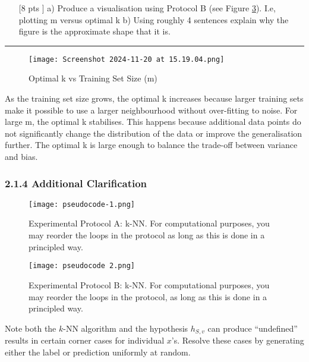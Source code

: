 \documentclass{article}
\begin{document}
\begin{enumerate}
    \item[[8 pts]] a) Produce a visualisation using Protocol B (see Figure \ref{pseudocode 2}). I.e, plotting m versus optimal k b) Using roughly 4 sentences explain why the figure is the approximate shape that it is.
\end{enumerate}


\noindent\textcolor{gray}{\rule{0.1\linewidth}{0.5pt}}

\begin{figure}[H]
    \centering
    \texttt{[image: Screenshot 2024-11-20 at 15.19.04.png]}
    \caption{Optimal k vs Training Set Size (m)}
    \label{fig:enter-label}
\end{figure}

As the training set size grows, the optimal k increases because larger training sets make it possible to use a larger neighbourhood without over-fitting to noise. For large m, the optimal k stabilises. This happens because additional data points do not significantly change the distribution of the data or improve the generalisation further. The optimal k is large enough to balance the trade-off between variance and bias.



\subsubsection*{2.1.4 Additional Clarification}

\begin{figure}[H]
    \centering
    \texttt{[image: pseudocode-1.png]}
    \caption{Experimental Protocol A: k-NN. For computational purposes, you may reorder the loops in the protocol as long as this is done in a principled way.}
    \label{pseudocode 1}
\end{figure}

\begin{figure}[H]
    \centering
    \texttt{[image: pseudocode 2.png]}
    \caption{Experimental Protocol B: k-NN. For computational purposes, you may reorder the loops in the protocol, as long as this is done in a principled way.}
    \label{pseudocode 2}
\end{figure}

Note both the $k$-NN algorithm and the hypothesis $h_{S,v}$ can produce ``undefined'' results in certain corner cases for individual $x$'s. Resolve these cases by generating either the label or prediction uniformly at random.
\end{document}
